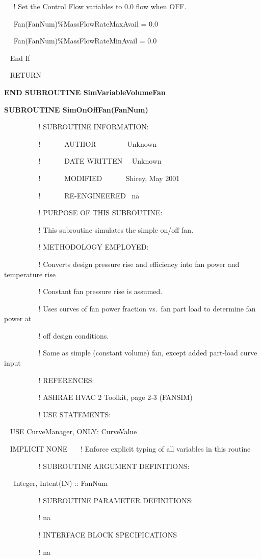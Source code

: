 ~~ ! Set the Control Flow variables to 0.0 flow when OFF.

~~ Fan(FanNum)\%MassFlowRateMaxAvail = 0.0

~~ Fan(FanNum)\%MassFlowRateMinAvail = 0.0

~ End If

~ RETURN

\textbf{END SUBROUTINE SimVariableVolumeFan}

\textbf{SUBROUTINE SimOnOffFan(FanNum)}

~~~~~~~~~ ! SUBROUTINE INFORMATION:

~~~~~~~~~ !~~~~~~ AUTHOR~~~~~~~~ Unknown

~~~~~~~~~ !~~~~~~ DATE WRITTEN~~ Unknown

~~~~~~~~~ !~~~~~~ MODIFIED~~~~~~ Shirey, May 2001

~~~~~~~~~ !~~~~~~ RE-ENGINEERED~ na

~~~~~~~~~ ! PURPOSE OF THIS SUBROUTINE:

~~~~~~~~~ ! This subroutine simulates the simple on/off fan.

~~~~~~~~~ ! METHODOLOGY EMPLOYED:

~~~~~~~~~ ! Converts design pressure rise and efficiency into fan power and temperature rise

~~~~~~~~~ ! Constant fan pressure rise is assumed.

~~~~~~~~~ ! Uses curves of fan power fraction vs.~fan part load to determine fan power at

~~~~~~~~~ ! off design conditions.

~~~~~~~~~ ! Same as simple (constant volume) fan, except added part-load curve input

~~~~~~~~~ ! REFERENCES:

~~~~~~~~~ ! ASHRAE HVAC 2 Toolkit, page 2-3 (FANSIM)

~~~~~~~~~ ! USE STATEMENTS:

~ USE CurveManager, ONLY: CurveValue

~ IMPLICIT NONE~~~ ! Enforce explicit typing of all variables in this routine

~~~~~~~~~ ! SUBROUTINE ARGUMENT DEFINITIONS:

~~ Integer, Intent(IN) :: FanNum

~~~~~~~~~ ! SUBROUTINE PARAMETER DEFINITIONS:

~~~~~~~~~ ! na

~~~~~~~~~ ! INTERFACE BLOCK SPECIFICATIONS

~~~~~~~~~ ! na

